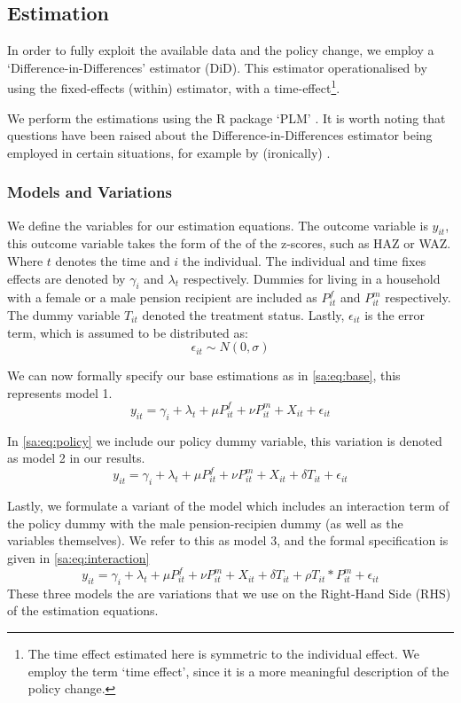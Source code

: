 \begin{refsection}
\subsection{Estimation}
In order to fully exploit the available data and the policy change,
we employ a `Difference-in-Differences' estimator (DiD).
This estimator operationalised by using the fixed-effects (within) estimator, with a time-effect\footnote{The time effect estimated here is symmetric to the individual effect.
We employ the term `time effect', since it is a more meaningful description of the policy change.}.

We perform the estimations using the R package `PLM' \parencite[see][]{croissant2008panel}.
It is worth noting  that questions have been raised about the Difference-in-Differences estimator being employed in certain situations,
for example by (ironically) \textcite{bertrand2004much}.

\subsubsection{Models and Variations}
We define the variables for our estimation equations.
The outcome variable is $y_{it}$, this outcome variable takes the form of the of the z-scores,
such as HAZ or WAZ.
Where $t$ denotes the time and $i$ the individual.
The individual and time fixes effects are denoted by $\gamma_i$ and $\lambda_t$ respectively.
Dummies for living in a household with a female or a male pension recipient are included as $P^f_{it}$ and $P^m_{it}$ respectively.
The dummy variable $T_{it}$ denoted the treatment status.
Lastly, $\epsilon_{it}$ is the error term, which is assumed to be distributed as:
\[
\epsilon_{it} \sim N(0,\sigma)
\]

We can now formally specify our base estimations as in \autoref{sa:eq:base}, this represents model 1.
\begin{equation}
\label{sa:eq:base}
y_{it} = \gamma_i + \lambda_t + \mu P^f_{it} + \nu P^m_{it} + X_{it} + \epsilon_{it}
\end{equation}

In \autoref{sa:eq:policy} we include our policy dummy variable, this variation is denoted as model 2 in our results.
\begin{equation}
\label{sa:eq:policy}
y_{it} = \gamma_i + \lambda_t + \mu P^f_{it} + \nu P^m_{it} + X_{it} + \delta T_{it} + \epsilon_{it}
\end{equation}

Lastly, we formulate a variant of the model which includes an interaction term of the policy dummy with the male pension-recipien dummy
(as well as the variables themselves).
We refer to this as model 3, and the formal specification is given in \autoref{sa:eq:interaction}
\begin{equation}
\label{sa:eq:interaction}
y_{it} = \gamma_i + \lambda_t + \mu P^f_{it} + \nu P^m_{it} + X_{it} + \delta T_{it} + \rho T_{it}*P^m_{it} + \epsilon_{it}
\end{equation}
These three models the are variations that we use on the Right-Hand Side (RHS) of the estimation equations.


\end{refsection}
